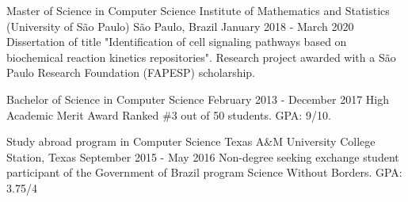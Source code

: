\documentclass[11pt, a4paper]{awesome-cv-res}
\begin{document}
\makecvheader
\makecvfooter
{}
{}
{\thepage}



\begin{cventries}
\cventry
{Master of Science in Computer Science}
{Institute of Mathematics and Statistics (University of São Paulo)} %
{São Paulo, Brazil} %
{January 2018 - March 2020}
{Dissertation of title "Identification of cell signaling pathways 
based on biochemical reaction kinetics repositories". Research project 
awarded with a São Paulo Research Foundation (FAPESP) scholarship.}
\newline

\cventry
{Bachelor of Science in Computer Science} %
{} %
{} %
{February 2013 - December 2017} %
{High Academic Merit Award Ranked \#3 out of 50 students.\newline
GPA: 9/10.}
\newline

\cventry
{Study abroad program in Computer Science}
{Texas A\&M University}
{College Station, Texas}
{September 2015 - May 2016}
{Non-degree seeking exchange student participant of the Government of Brazil program Science Without Borders. \newline GPA: 3.75/4}
\end{cventries}
\end{document}
